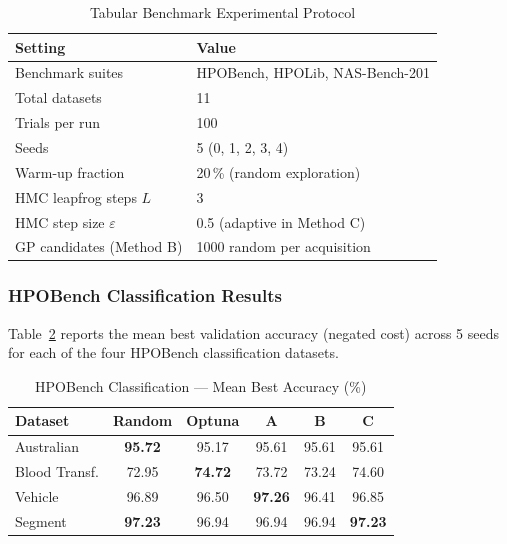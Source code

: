 \documentclass[12pt,a4paper]{article}
\begin{document}
\begin{table}[tb]
\centering
\caption{Tabular Benchmark Experimental Protocol}
\label{tab:tabular_protocol}
\renewcommand{\arraystretch}{1.2}
\begin{tabular}{ll}
\toprule
Setting & Value \\
\midrule
Benchmark suites     & HPOBench, HPOLib, NAS-Bench-201 \\
Total datasets       & 11 \\
Trials per run       & 100 \\
Seeds                & 5 (0, 1, 2, 3, 4) \\
Warm-up fraction     & 20\,\% (random exploration) \\
HMC leapfrog steps $L$ & 3 \\
HMC step size $\varepsilon$ & 0.5 (adaptive in Method C) \\
GP candidates (Method B) & 1000 random per acquisition \\
\bottomrule
\end{tabular}
\end{table}

\subsubsection{HPOBench Classification Results}

Table~\ref{tab:hpobench_class} reports the mean best validation accuracy
(negated cost) across 5 seeds for each of the four HPOBench classification
datasets.

\begin{table}[tb]
\centering
\caption{HPOBench Classification — Mean Best Accuracy (\%)}
\label{tab:hpobench_class}
\renewcommand{\arraystretch}{1.15}
\begin{tabular}{lccccc}
\toprule
\textbf{Dataset} & \textbf{Random} & \textbf{Optuna} & \textbf{A} & \textbf{B} & \textbf{C} \\
\midrule
Australian        & \textbf{95.72} & 95.17 & 95.61 & 95.61 & 95.61 \\
Blood Transf.     & 72.95 & \textbf{74.72} & 73.72 & 73.24 & 74.60 \\
Vehicle           & 96.89 & 96.50 & \textbf{97.26} & 96.41 & 96.85 \\
Segment           & \textbf{97.23} & 96.94 & 96.94 & 96.94 & \textbf{97.23} \\
\bottomrule
\end{tabular}
\end{table}
\end{document}
